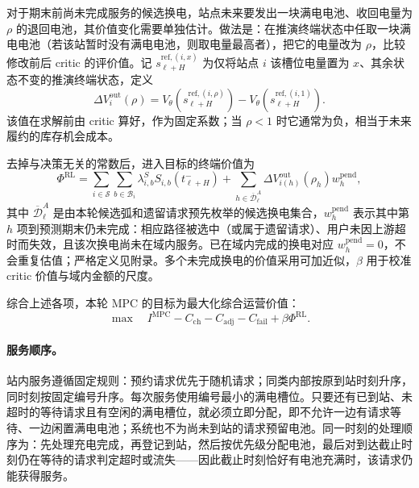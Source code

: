 \documentclass[12pt,a4paper,UTF8]{ctexart}
\begin{document}
对于期末前尚未完成服务的候选换电，站点未来要发出一块满电电池、收回电量为 $\rho$ 的退回电池，其价值变化需要单独估计。做法是：在推演终端状态中任取一块满电电池（若该站暂时没有满电电池，则取电量最高者），把它的电量改为 $\rho$，比较修改前后 critic 的评价值。记 $s_{\ell+H}^{\mathrm{ref},(i,x)}$ 为仅将站点 $i$ 该槽位电量置为 $x$、其余状态不变的推演终端状态，定义
\begin{equation}
\Delta V_{i}^{\mathrm{out}}(\rho)
=
 V_\theta\!\left(s_{\ell+H}^{\mathrm{ref},(i,\rho)}\right)
-V_\theta\!\left(s_{\ell+H}^{\mathrm{ref},(i,1)}\right).
\label{eq:outside_swap_value}
\end{equation}
该值在求解前由 critic 算好，作为固定系数；当 $\rho<1$ 时它通常为负，相当于未来履约的库存机会成本。

去掉与决策无关的常数后，进入目标的终端价值为
\begin{equation}
\Phi^{\mathrm{RL}}
=
\sum_{i\in\mathcal S}\sum_{b\in\mathcal B_i}
\lambda^S_{i,b}S_{i,b}(t_{\ell+H}^{-})
+\sum_{h\in\overline{\mathcal D}_{\ell}^{A}}
\Delta V_{i(h)}^{\mathrm{out}}(\rho_h)
w_h^{\mathrm{pend}},
\label{eq:rl_terminal_value}
\end{equation}
其中 $\overline{\mathcal D}_{\ell}^{A}$ 是由本轮候选弧和遗留请求预先枚举的候选换电集合，$w_h^{\mathrm{pend}}$ 表示其中第 $h$ 项到预测期末仍未完成：相应路径被选中（或属于遗留请求）、用户未因上游超时而失效，且该次换电尚未在域内服务。已在域内完成的换电对应 $w_h^{\mathrm{pend}}=0$，不会重复估值；严格定义见附录。多个未完成换电的价值采用可加近似，$\beta$ 用于校准 critic 价值与域内金额的尺度。

综合上述各项，本轮 MPC 的目标为最大化综合运营价值：
\begin{equation}
\max\quad
I^{\mathrm{MPC}}-C_{\mathrm{ch}}-C_{\mathrm{adj}}-C_{\mathrm{fail}}
+\beta\Phi^{\mathrm{RL}}.
\label{eq:objective}
\end{equation}

\paragraph{服务顺序。}
站内服务遵循固定规则：预约请求优先于随机请求；同类内部按原到站时刻升序，同时刻按固定编号升序。每次服务使用编号最小的满电槽位。只要还有已到站、未超时的等待请求且有空闲的满电槽位，就必须立即分配，即不允许一边有请求等待、一边闲置满电电池；系统也不为尚未到站的请求预留电池。同一时刻的处理顺序为：先处理充电完成，再登记到站，然后按优先级分配电池，最后对到达截止时刻仍在等待的请求判定超时或流失——因此截止时刻恰好有电池充满时，该请求仍能获得服务。
\end{document}

